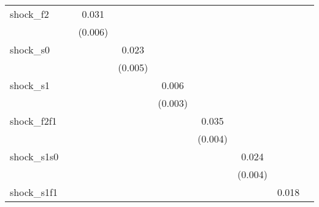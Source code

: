 {\begin{tabular}{l*{8}{c}}
\addlinespace
shock\_f2    &                     &       0.031\sym{***}&                     &                     &                     &                     &                     &                     \\
            &                     &     (0.006)         &                     &                     &                     &                     &                     &                     \\
\addlinespace
shock\_s0    &                     &                     &       0.023\sym{***}&                     &                     &                     &                     &                     \\
            &                     &                     &     (0.005)         &                     &                     &                     &                     &                     \\
\addlinespace
shock\_s1    &                     &                     &                     &       0.006\sym{**} &                     &                     &                     &                     \\
            &                     &                     &                     &     (0.003)         &                     &                     &                     &                     \\
\addlinespace
shock\_f2f1  &                     &                     &                     &                     &       0.035\sym{***}&                     &                     &                     \\
            &                     &                     &                     &                     &     (0.004)         &                     &                     &                     \\
\addlinespace
shock\_s1s0  &                     &                     &                     &                     &                     &       0.024\sym{***}&                     &                     \\
            &                     &                     &                     &                     &                     &     (0.004)         &                     &                     \\
\addlinespace
shock\_s1f1  &                     &                     &                     &                     &                     &                     &       0.018\sym{**} &                     \\

\end{tabular}}
